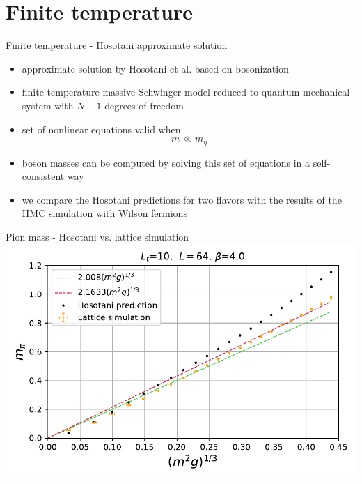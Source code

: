 \documentclass[english]{beamer}
\begin{document}
  
\section{Finite temperature}

\begin{frame}{Finite temperature - Hosotani approximate solution}
  \begin{itemize}
    \item approximate solution by Hosotani et al.
      based on bosonization
    \item finite temperature massive Schwinger model reduced to
      quantum mechanical system with $N - 1$ degrees of freedom
    \item set of nonlinear equations valid when
      \[
        m \ll m_\eta
      \]
    \item boson masses can be computed by solving this set of 
      equations in a self-consistent way
    \item we compare the Hosotani predictions for two flavors
      with the results of the HMC simulation with Wilson fermions
  \end{itemize}
\end{frame}

\begin{frame}{Pion mass - Hosotani vs. lattice simulation}
  \includegraphics[width=1\textwidth]{figs/MPi64x10FiniteT}
\end{frame}
\end{document}

